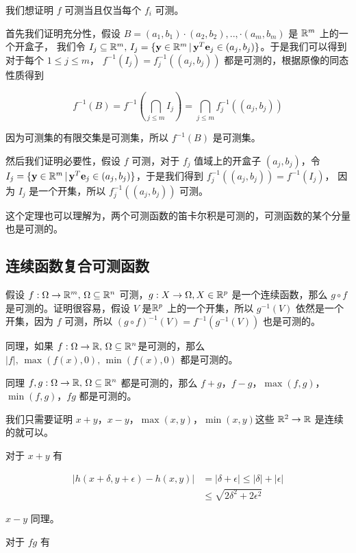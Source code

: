 我们想证明 $f$ 可测当且仅当每个 $f_i$ 可测。

首先我们证明充分性，假设 $B=(a_1,b_1) \cdot (a_2, b_2),.., \cdot(a_m,b_m)$ 是 $\mathbb{R}^m$ 上的一个开盒子，
我们令 $I_j \subseteq \mathbb{R}^m,\, I_j = \{ \mathbf{y} \in \mathbb{R}^m \,\vert\, \mathbf{y}^T \mathbf{e}_j \in (a_j, b_j)\}$。于是我们可以得到对于每个 $1 \le j \le m$，
$f^{-1}(I_j) = f_j^{-1}((a_j,b_j))$ 都是可测的，根据原像的同态性质得到

\[
f^{-1}(B) = f^{-1}(\bigcap_{j \le m}I_j) =\bigcap_{j \le m}f_j^{-1}((a_j, b_j))
\]

因为可测集的有限交集是可测集，所以 $ f^{-1}(B)$  是可测集。


然后我们证明必要性，假设 $f$ 可测，对于 $f_j$ 值域上的开盒子 $ (a_j, b_j)$，令
$I_j = \{ \mathbf{y} \in \mathbb{R}^m \,\vert\, \mathbf{y}^T \mathbf{e}_j \in (a_j, b_j)\}$，于是我们得到 $f_j^{-1}((a_j, b_j)) = f^{-1}(I_j)$，
因为 $I_j$ 是一个开集，所以 $f_j^{-1}((a_j, b_j))$ 可测。

这个定理也可以理解为，两个可测函数的笛卡尔积是可测的，可测函数的某个分量也是可测的。


\subsection{连续函数复合可测函数}

假设 $f: \Omega \to \mathbb{R}^m,\, \Omega \subseteq \mathbb{R}^n$ 可测，$g: X \to \Omega, X \in \mathbb{R}^p$ 是一个连续函数，那么 $g \circ f$ 是可测的。证明很容易，假设 $V$ 是$\mathbb{R}^p$ 上的一个开集，所以
$g^{-1}(V)$ 依然是一个开集，因为 $f$ 可测，所以 $ (g \circ f)^{-1}(V) = f^{-1}(g^{-1}(V))$ 也是可测的。

同理，如果 $f: \Omega\to \mathbb{R},\, \Omega \subseteq \mathbb{R}^n$是可测的，那么 $\lvert f \rvert,\, \max(f(x), 0), \, \min(f(x), 0)$ 都是可测的。

同理 $f, g: \Omega\to \mathbb{R},\, \Omega \subseteq \mathbb{R}^n$ 都是可测的，那么 $f +g$，$f-g$，$\max(f,g)$，$\min(f,g)$，$fg$ 都是可测的。

我们只需要证明 $x+y$，$x-y$，$\max(x,y)$，$\min(x,y)$这些 $\mathbb{R}^2 \to \mathbb{R}$ 是连续的就可以。

对于 $x+y$ 有 

\begin{align*}
\lvert h(x+\delta, y+\epsilon) - h(x,y) \rvert &= \lvert \delta + \epsilon \rvert \le \lvert \delta \rvert + \lvert \epsilon \rvert \\
& \le \sqrt{2\delta^2 + 2\epsilon^2}
\end{align*}

$x-y$ 同理。

对于 $fg$ 有

